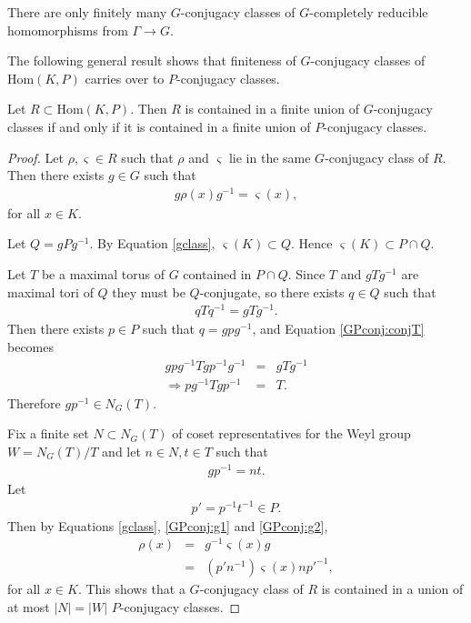 \begin{theorem} \label{thm:finiteGCR} There are only finitely many $G$-conjugacy classes of $G$-completely reducible homomorphisms from $\Gamma\rightarrow G$.
\end{theorem}


The following general result shows that finiteness of $G$-conjugacy classes of $\mathrm{Hom}(K, P)$ carries over to $P$-conjugacy classes. 
\begin{lemma} Let $R \subset \mathrm{Hom}(K, P)$. Then $R$ is contained in a finite union of $G$-conjugacy classes if and only if it is contained in a finite union of $P$-conjugacy classes.
  \label{lem:GPconj}
\end{lemma}
\begin{proof}
	Let $\rho, \varsigma \in R$ such that $\rho$ and $\varsigma$ lie in the same $G$-conjugacy class of $R$. Then there exists $g\in G$ such that
	\begin{eqnarray} \label{gclass}
		g \rho(x) g^{-1} = \varsigma(x),
	\end{eqnarray}
for all $x \in K$.
	
	Let $Q = gPg^{-1}$. By Equation \ref{gclass}, $\varsigma(K) \subset Q$. Hence $\varsigma(K) \subset P \cap Q$.
	
	Let $T$ be a maximal torus of $G$ contained in $P\cap Q$. Since $T$ and $gTg^{-1}$ are maximal tori of $Q$ they must be $Q$-conjugate, so there exists $q\in Q$ such that
	\begin{eqnarray} \label{GPconj:conjT}
		qTq^{-1} = gTg^{-1}.
	\end{eqnarray}
	Then there exists $p\in P$ such that $q = gpg^{-1}$, and Equation \ref{GPconj:conjT} becomes
	\begin{eqnarray*}
		gpg^{-1}Tgp^{-1}g^{-1} &=& gTg^{-1} \\
		\Rightarrow pg^{-1}Tgp^{-1} &=& T.
	\end{eqnarray*}
	Therefore $gp^{-1} \in N_G(T)$. 

	Fix a finite set $N \subset N_G(T)$ of coset representatives for the Weyl group $W = N_G(T)/T$ and let $n \in N, t \in T$ such that
	\begin{eqnarray} \label{GPconj:g1}
		gp^{-1} = nt.
	\end{eqnarray}
	Let \begin{eqnarray} \label{GPconj:g2} p' = p^{-1}t^{-1} \in P. \end{eqnarray} Then by Equations \ref{gclass}, \ref{GPconj:g1} and \ref{GPconj:g2},
	\begin{eqnarray*}
		\rho(x) &=& g^{-1} \varsigma(x) g\\
		&=& (p'n^{-1}) \varsigma(x) np'^{-1},
	\end{eqnarray*}
	for all $x \in K$.
	This shows 
	that a $G$-conjugacy class of $R$ is contained in a union of at most $|N| = |W|$ $P$-conjugacy classes.


\end{proof}
